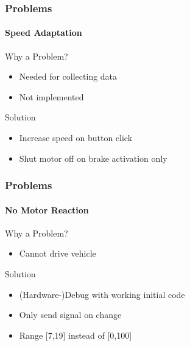 \documentclass[8pt]{beamer}
\begin{document}
\begin{frame}
	\frametitle{Problems}
	\framesubtitle{Speed Adaptation}
	\begin{block}{Why a Problem?}
		\begin{itemize}
			\item Needed for collecting data
			\item Not implemented
		\end{itemize}
	\end{block}
	\begin{block}{Solution}
		\begin{itemize}
			\item Increase speed on button click
			\item Shut motor off on brake activation only
		\end{itemize}
	\end{block}	
\end{frame}

\begin{frame}
	\frametitle{Problems}
	\framesubtitle{No Motor Reaction}
	\begin{block}{Why a Problem?}
		\begin{itemize}
			\item Cannot drive vehicle
		\end{itemize}
	\end{block}
	\begin{block}{Solution}
		\begin{itemize}
			\item (Hardware-)Debug with working initial code
			\item Only send signal on change
			\item Range [7,19] instead of [0,100]
		\end{itemize}
	\end{block}	
\end{frame}
\end{document}
